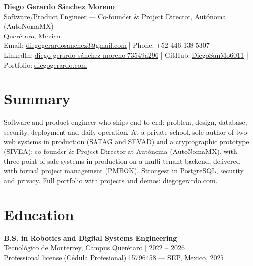 \documentclass[10pt,letterpaper]{article}
\begin{document}
\thispagestyle{empty}

{\Huge\bfseries Diego Gerardo Sánchez Moreno}\\
\small Software/Product Engineer — Co-founder \& Project Director, Autónoma (AutoNomaMX)\\
\small Querétaro, Mexico \\
\small Email: \href{mailto:diegogerardosanchez3@gmail.com}{diegogerardosanchez3@gmail.com} \;|\; Phone: +52 446 138 5307\\
\small LinkedIn: \href{https://www.linkedin.com/in/diego-gerardo-sánchez-moreno-73549a296}{diego-gerardo-sánchez-moreno-73549a296} \;|\; GitHub: \href{https://github.com/DiegoSanMo6011}{DiegoSanMo6011} \;|\; Portfolio: \href{https://diegogerardo.com}{diegogerardo.com}

\section*{Summary}
Software and product engineer who ships end to end: problem, design, database, security, deployment and daily operation. At a private school, sole author of two web systems in production (SATAG and SEVAD) and a cryptographic prototype (SIVEA); co-founder \& Project Director at Autónoma (AutoNomaMX), with three point-of-sale systems in production on a multi-tenant backend, delivered with formal project management (PMBOK). Strongest in PostgreSQL, security and privacy. Full portfolio with projects and demos: diegogerardo.com.

\section*{Education}
\textbf{B.S. in Robotics and Digital Systems Engineering}\\
Tecnológico de Monterrey, Campus Querétaro | 2022 -- 2026\\
Professional license (Cédula Profesional) 15796458 — SEP, Mexico, 2026
\end{document}
